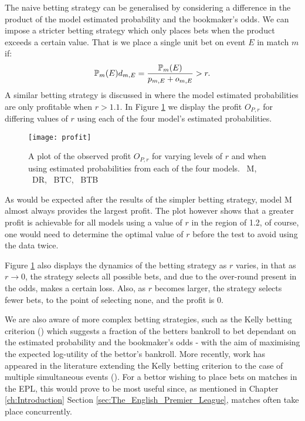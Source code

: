 The naive betting strategy can be generalised by considering a difference in the product of the model estimated
probability and the bookmaker's odds. We can impose a stricter betting strategy which only places bets when the product
exceeds a certain value. That is we place a single unit bet on event \(E\) in match \(m\) if:
\begin{align} 
\mathbb{P}_m(E) d_{m, E} = \frac{\mathbb{P}_m(E)}{p_{m, E} + o_{m, E}} > r.
\end{align}
A similar betting strategy is discussed in \cite{DixonColes1997} where the model estimated probabilities are only
profitable when \(r > 1.1\). In Figure \ref{fig:profit} we display the profit \(O_{P, r}\) for differing values of \(r\)
using each of the four model's estimated probabilities.
\begin{figure}[htp]
\begin{center}
\texttt{[image: profit]}
\caption{A plot of the observed profit \(O_{P, r}\) for varying levels of \(r\) and when using estimated probabilities
from each of the four models. \protect\blueSolidLine\ M, \protect\redSolidLine\ DR, \protect\greenSolidLine\ BTC,
\protect\blackSolidLine\ BTB}
\label{fig:profit} 
\end{center}
\end{figure}
As would be expected after the results of the simpler betting strategy, model M almost always provides the largest
profit. The plot however shows that a greater profit is achievable for all models using a value of \(r\) in the region
of 1.2, of course, one would need to determine the optimal value of \(r\) before the test to avoid using the data twice.

Figure \ref{fig:profit} also displays the dynamics of the betting strategy as \(r\) varies, in that as \(r \rightarrow
0\), the strategy selects all possible bets, and due to the over-round present in the odds, makes a certain loss. Also,
as \(r\) becomes larger, the strategy selects fewer bets, to the point of selecting none, and the profit is 0.

We are also aware of more complex betting strategies, such as the Kelly betting criterion (\cite{kelly1956}) which
suggests a fraction of the betters bankroll to bet dependant on the estimated probability and the bookmaker's odds -
with the aim of maximising the expected log-utility of the bettor's bankroll. More recently, work has appeared in the
literature extending the Kelly betting criterion to the case of multiple simultaneous events (\cite{whitrow2007}). For a
bettor wishing to place bets on matches in the \gls{EPL}, this would prove to be most useful since, as mentioned in
Chapter \ref{ch:Introduction} Section \ref{sec:The_English_Premier_League}, matches often take place concurrently.

